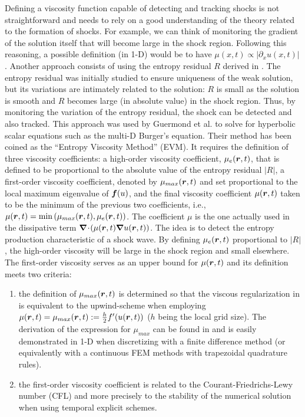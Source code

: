 Defining a viscosity function capable of detecting and tracking shocks is not straightforward and needs to rely on a good understanding of the theory related to the formation of shocks. For example, we can think of monitoring the gradient of the solution itself that will become large in the shock region. Following this reasoning, a possible definition (in 1-D) would be to have $\mu(x,t) \propto \left| \partial_x u(x,t) \right|$. Another approach consists of using the entropy residual $R$ derived in . The entropy residual was initially studied to ensure uniqueness of the weak solution, but its variations are intimately related to the solution: $R$ is small as the solution is smooth and $R$ becomes large (in absolute value) in the shock region. Thus, by monitoring the variation of the entropy residual, the shock can be detected and also tracked. This approach was used by Guermond et al. \cite{jlg1, jlg2, jlg3} to solve for hyperbolic scalar equations such as the multi-D Burger's equation. Their method has been coined as the ``Entropy Viscosity Method'' (EVM). It requires the definition of three viscosity coefficients: a high-order viscosity coefficient, $\mu_e(\boldsymbol r,t)$, that is defined to be proportional to the absolute value of the entropy residual $\left| R\right|$,  a first-order viscosity coefficient, denoted by $\mu_{max}(\boldsymbol r,t)$ and set proportional to the local maximum eigenvalue of $\boldsymbol f(u)$, and the final viscosity coefficient $\mu(\boldsymbol r,t)$ taken to be the minimum of the previous two coefficients, i.e., $\mu(\boldsymbol r,t) = \min \left( \mu_{max}(\boldsymbol r,t), \mu_e(\boldsymbol r,t) \right)$. The coefficient $\mu$ is the one actually used in the dissipative term $\boldsymbol{\nabla}\! \cdot \! \left( \mu(\boldsymbol r,t) \boldsymbol{\nabla} u(\boldsymbol r,t) \right)$. The idea is to detect the entropy production characteristic of a shock wave. By defining $\mu_e(\boldsymbol r,t)$ proportional to $\left| R \right|$, the high-order viscosity will be large in the shock region and small elsewhere. The first-order viscosity serves as an upper bound for $\mu(\boldsymbol r,t)$ and its definition meets two criteria:
\begin{enumerate}
\item the definition of $\mu_{max}(\boldsymbol r,t)$ is determined so that the viscous regularization in  is equivalent to the upwind-scheme when employing $\mu(\boldsymbol r,t) = \mu_{max}(\boldsymbol r,t) := \frac{h}{2} f'(u(\boldsymbol r,t))$ ($h$ being the local grid size). The derivation of the expression for $\mu_{max}$ can be found in \cite{jlg} and is easily demonstrated in 1-D when discretizing  with a finite difference method (or equivalently with a continuous FEM methods with trapezoidal quadrature rules). 
\item the first-order viscosity coefficient is related to the Courant-Friedrichs-Lewy number (CFL) and more precisely to the stability of the numerical solution when using temporal explicit schemes.
\end{enumerate}
